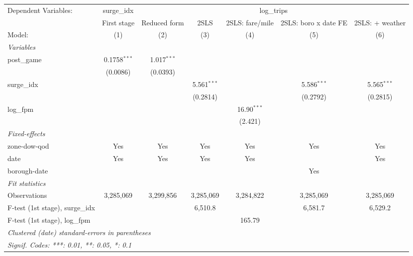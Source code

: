 
\begingroup
\centering
\begin{tabular}{lcccccc}
   \tabularnewline \midrule \midrule
   Dependent Variables: & surge\_idx & \multicolumn{5}{c}{log\_trips}\\
                                   & First stage    & Reduced form  & 2SLS          & 2SLS: fare/mile & 2SLS: boro x date FE & 2SLS: + weather \\   
   Model:                          & (1)            & (2)           & (3)           & (4)             & (5)                  & (6)\\  
   \midrule
   \emph{Variables}\\
   post\_game                      & 0.1758$^{***}$ & 1.017$^{***}$ &               &                 &                      &   \\   
                                   & (0.0086)       & (0.0393)      &               &                 &                      &   \\   
   surge\_idx                      &                &               & 5.561$^{***}$ &                 & 5.586$^{***}$        & 5.565$^{***}$\\   
                                   &                &               & (0.2814)      &                 & (0.2792)             & (0.2815)\\   
   log\_fpm                        &                &               &               & 16.90$^{***}$   &                      &   \\   
                                   &                &               &               & (2.421)         &                      &   \\   
   \midrule
   \emph{Fixed-effects}\\
   zone-dow-qod                    & Yes            & Yes           & Yes           & Yes             & Yes                  & Yes\\  
   date                            & Yes            & Yes           & Yes           & Yes             &                      & Yes\\  
   borough-date                    &                &               &               &                 & Yes                  & \\  
   \midrule
   \emph{Fit statistics}\\
   Observations                    & 3,285,069      & 3,299,856     & 3,285,069     & 3,284,822       & 3,285,069            & 3,285,069\\  
   F-test (1st stage), surge\_idx  &                &               & 6,510.8       &                 & 6,581.7              & 6,529.2\\  
   F-test (1st stage), log\_fpm    &                &               &               & 165.79          &                      & \\  
   \midrule \midrule
   \multicolumn{7}{l}{\emph{Clustered (date) standard-errors in parentheses}}\\
   \multicolumn{7}{l}{\emph{Signif. Codes: ***: 0.01, **: 0.05, *: 0.1}}\\
\end{tabular}
\par\endgroup


